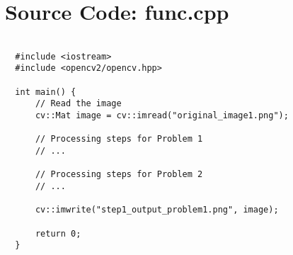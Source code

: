 \documentclass[12pt,a4paper]{report}
\begin{document}
\chapter{Source Code: func.cpp}
\begin{lstlisting}
  
  #include <iostream>
  #include <opencv2/opencv.hpp>
  
  int main() {
      // Read the image
      cv::Mat image = cv::imread("original_image1.png");
  
      // Processing steps for Problem 1
      // ...
  
      // Processing steps for Problem 2
      // ...
  
      cv::imwrite("step1_output_problem1.png", image);
  
      return 0;
  }
  \end{lstlisting}
\end{document}
